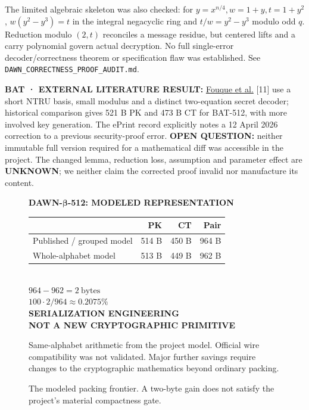 \documentclass[
  10pt,
  a4paper,
]{article}
\begin{document}
The limited algebraic skeleton was also checked: for
\(y=x^{n/4},w=1+y,t=1+y^2\), \(w(y^2-y^3)=t\) in the integral negacyclic
ring and \(t/w=y^2-y^3\) modulo odd \(q\). Reduction modulo \((2,t)\)
reconciles a message residue, but centered lifts and a carry polynomial
govern actual decryption. No full single-error decoder/correctness
theorem or specification flaw was established. See
\texttt{DAWN\_CORRECTNESS\_PROOF\_AUDIT.md}.

\textbf{BAT · EXTERNAL LITERATURE RESULT:}
\href{https://eprint.iacr.org/2022/031}{Fouque et al.} {[}11{]} use a
short NTRU basis, small modulus and a distinct two-equation secret
decoder; historical comparison gives 521 B PK and 473 B CT for BAT-512,
with more involved key generation. The ePrint record explicitly notes a
12 April 2026 correction to a previous security-proof error.
\textbf{OPEN QUESTION:} neither immutable full version required for a
mathematical diff was accessible in the project. The changed lemma,
reduction loss, assumption and parameter effect are \textbf{UNKNOWN}; we
neither claim the corrected proof invalid nor manufacture its content.

\begin{figure}[htbp]
\centering
\begin{minipage}{0.88\linewidth}
\centering
\textsf{\textbf{DAWN-$\boldsymbol\beta$-512: MODELED REPRESENTATION}}\\[16pt]
\begin{tabular}{lrrr}
\toprule & PK & CT & Pair \\\midrule
Published / grouped model & 514 B & 450 B & 964 B \\
Whole-alphabet model & 513 B & 449 B & 962 B \\\bottomrule
\end{tabular}\\[18pt]
{\Large $964-962=2\ \mathrm{bytes}$}\\[8pt]
$100\cdot 2/964\approx 0.2075\%$\\[18pt]
\textsf{\textbf{SERIALIZATION ENGINEERING}}\\[4pt]
\textsf{\textbf{NOT A NEW CRYPTOGRAPHIC PRIMITIVE}}\\[12pt]
\raggedright Same-alphabet arithmetic from the project model. Official wire compatibility was not validated. Major further savings require changes to the cryptographic mathematics beyond ordinary packing.
\end{minipage}
\caption{The modeled packing frontier. A two-byte gain does not satisfy the project's material compactness gate.}\label{fig:dawn}
\end{figure}
\end{document}

